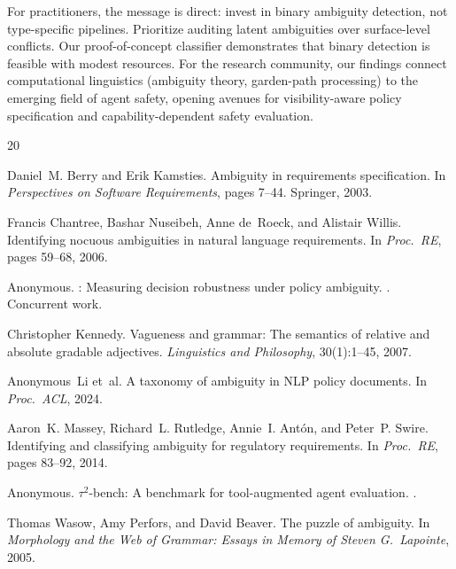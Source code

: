 \documentclass[11pt,a4paper]{article}
\begin{document}
For practitioners, the message is direct: invest in binary ambiguity detection, not type-specific pipelines.
Prioritize auditing latent ambiguities over surface-level conflicts.
Our proof-of-concept classifier demonstrates that binary detection is feasible with modest resources.
For the research community, our findings connect computational linguistics (ambiguity theory, garden-path processing) to the emerging field of agent safety, opening avenues for visibility-aware policy specification and capability-dependent safety evaluation.




\begin{thebibliography}{20}

Daniel~M. Berry and Erik Kamsties.
\newblock Ambiguity in requirements specification.
\newblock In \emph{Perspectives on Software Requirements}, pages 7--44. Springer, 2003.

Francis Chantree, Bashar Nuseibeh, Anne de~Roeck, and Alistair Willis.
\newblock Identifying nocuous ambiguities in natural language requirements.
\newblock In \emph{Proc.\ RE}, pages 59--68, 2006.

Anonymous.
: Measuring decision robustness under policy ambiguity.
. Concurrent work.

Christopher Kennedy.
\newblock Vagueness and grammar: The semantics of relative and absolute gradable adjectives.
\newblock \emph{Linguistics and Philosophy}, 30(1):1--45, 2007.

Anonymous~Li et~al.
\newblock A taxonomy of ambiguity in NLP policy documents.
\newblock In \emph{Proc.\ ACL}, 2024.

Aaron~K. Massey, Richard~L. Rutledge, Annie~I. Ant\'on, and Peter~P. Swire.
\newblock Identifying and classifying ambiguity for regulatory requirements.
\newblock In \emph{Proc.\ RE}, pages 83--92, 2014.

Anonymous.
\newblock $\tau^2$-bench: A benchmark for tool-augmented agent evaluation.
.

Thomas Wasow, Amy Perfors, and David Beaver.
\newblock The puzzle of ambiguity.
\newblock In \emph{Morphology and the Web of Grammar: Essays in Memory of Steven G.\ Lapointe}, 2005.

\end{thebibliography}
\end{document}
